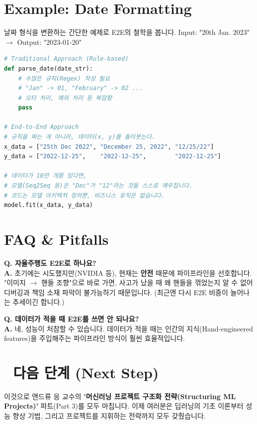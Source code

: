 \documentclass[11pt,a4paper]{book}
\theoremstyle{definition}
\begin{document}
\section{Example: Date Formatting}

날짜 형식을 변환하는 간단한 예제로 E2E의 철학을 봅니다.
Input: "20th Jan. 2023" $\to$ Output: "2023-01-20"

\begin{lstlisting}[language=Python, caption=E2E Logic Overview, breaklines=true]
# Traditional Approach (Rule-based)
def parse_date(date_str):
    # 수많은 규칙(Regex) 작성 필요
    # "Jan" -> 01, "February" -> 02 ...
    # 오타 처리, 예외 처리 등 복잡함
    pass

# End-to-End Approach
# 규칙을 짜는 게 아니라, 데이터(x, y)를 들이붓는다.
x_data = ["25th Dec 2022", "December 25, 2022", "12/25/22"]
y_data = ["2022-12-25",    "2022-12-25",        "2022-12-25"]

# 데이터가 10만 개쯤 있다면, 
# 모델(Seq2Seq 등)은 "Dec"가 "12"라는 것을 스스로 깨우칩니다.
# 코드는 모델 아키텍처 정의뿐, 비즈니스 로직은 없습니다.
model.fit(x_data, y_data)
\end{lstlisting}

\section{FAQ \& Pitfalls}

\textbf{Q. 자율주행도 E2E로 하나요?} \\
\textbf{A.} 초기에는 시도했지만(NVIDIA 등), 현재는 \textbf{안전} 때문에 파이프라인을 선호합니다. "이미지 $\to$ 핸들 조향"으로 바로 가면, 사고가 났을 때 왜 핸들을 꺾었는지 알 수 없어 디버깅과 책임 소재 파악이 불가능하기 때문입니다. (최근엔 다시 E2E 비중이 늘어나는 추세이긴 합니다.)

\textbf{Q. 데이터가 적을 때 E2E를 쓰면 안 되나요?} \\
\textbf{A.} 네, 성능이 처참할 수 있습니다. 데이터가 적을 때는 인간의 지식(Hand-engineered features)을 주입해주는 파이프라인 방식이 훨씬 효율적입니다.

\section*{🔗 다음 단계 (Next Step)}
이것으로 앤드류 응 교수의 \textbf{'머신러닝 프로젝트 구조화 전략(Structuring ML Projects)'} 파트(Part 3)를 모두 마칩니다.
이제 여러분은 딥러닝의 기초 이론부터 성능 향상 기법, 그리고 프로젝트를 지휘하는 전략까지 모두 갖췄습니다.
\end{document}
